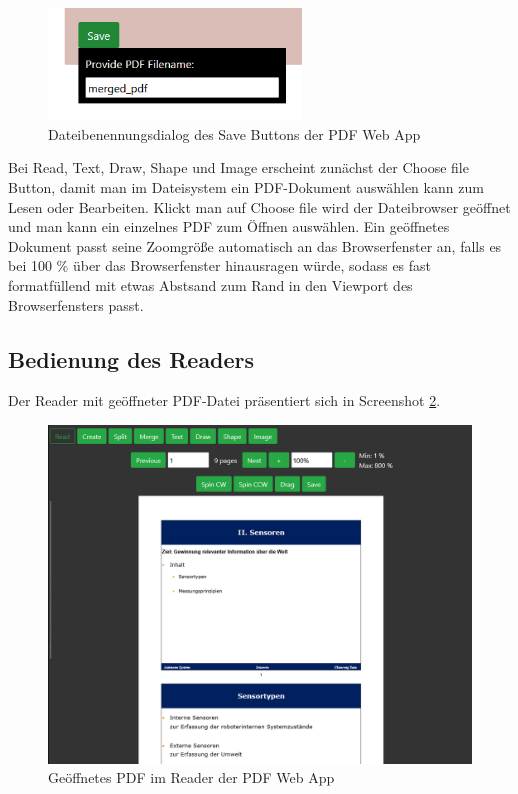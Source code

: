 \begin{figure}[!htbp]
	\centering
	\includegraphics[width=0.6\textwidth]{"images/save.png"}
	\caption{Dateibenennungsdialog des Save Buttons der PDF Web App}
	\label{fig:save}
\end{figure}

Bei Read, Text, Draw, Shape und Image erscheint zunächst der Choose file Button, damit man im Dateisystem ein PDF-Dokument auswählen kann zum Lesen oder Bearbeiten. Klickt man auf Choose file wird der Dateibrowser geöffnet und man kann ein einzelnes PDF zum Öffnen auswählen. Ein geöffnetes Dokument passt seine Zoomgröße automatisch an das Browserfenster an, falls es bei 100 \% über das Browserfenster hinausragen würde, sodass es fast formatfüllend mit etwas Abstsand zum Rand in den Viewport des Browserfensters passt. 

\subsection{Bedienung des Readers}
Der Reader mit geöffneter PDF-Datei präsentiert sich in Screenshot \ref{fig:reader}.

\begin{figure}[!htbp]
	\centering
	\includegraphics[width=1\textwidth]{"images/reader.png"}
	\caption{Geöffnetes PDF im Reader der PDF Web App}
	\label{fig:reader}
\end{figure}

